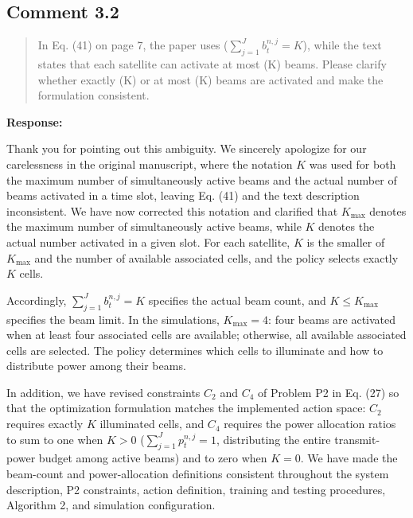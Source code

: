 \documentclass[11pt,a4paper]{article}
\begin{document}
\subsection*{Comment 3.2}

\begin{quote}\small In Eq. (41) on page 7, the paper uses ($\sum_{j=1}^{J} b_t^{n,j}=K$), while the text states that each satellite can activate at most (K) beams. Please clarify whether exactly (K) or at most (K) beams are activated and make the formulation consistent.\end{quote}

\textbf{Response:}\par

Thank you for pointing out this ambiguity. We sincerely apologize for our carelessness in the original manuscript, where the notation $K$ was used for both the maximum number of simultaneously active beams and the actual number of beams activated in a time slot, leaving Eq. (41) and the text description inconsistent. We have now corrected this notation and clarified that $K_{\max}$ denotes the maximum number of simultaneously active beams, while $K$ denotes the actual number activated in a given slot. For each satellite, $K$ is the smaller of $K_{\max}$ and the number of available associated cells, and the policy selects exactly $K$ cells.
\par

Accordingly, $\sum_{j=1}^{J}b_t^{n,j}=K$ specifies the actual beam count, and $K\le K_{\max}$ specifies the beam limit. In the simulations, $K_{\max}=4$: four beams are activated when at least four associated cells are available; otherwise, all available associated cells are selected. The policy determines which cells to illuminate and how to distribute power among their beams.
\par

In addition, we have revised constraints $C_2$ and $C_4$ of Problem P2 in Eq. (27) so that the optimization formulation matches the implemented action space: $C_2$ requires exactly $K$ illuminated cells, and $C_4$ requires the power allocation ratios to sum to one when $K>0$ ($\sum_{j=1}^{J}p_t^{n,j}=1$, distributing the entire transmit-power budget among active beams) and to zero when $K=0$. We have made the beam-count and power-allocation definitions consistent throughout the system description, P2 constraints, action definition, training and testing procedures, Algorithm 2, and simulation configuration.
\par
\end{document}
